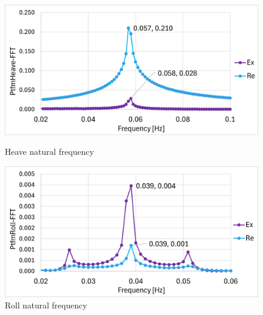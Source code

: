 \documentclass[a4paper, 11pt]{article}
\begin{document}
\begin{figure}[H]
    \begin{minipage}{0.47\textwidth}
        \centering
        \includegraphics[width=1\textwidth]{nat_freq_heave_1.png}
        \caption{\small Heave natural frequency}
        \label{fig:nat_freq_heave_recreated}
    \end{minipage}
    \hfill
    \begin{minipage}{0.48\textwidth}
        \centering
        \includegraphics[width=1\textwidth]{nat_freq_roll_1.png}
        \caption{\small Roll natural frequency}
        \label{fig:nat_freq_roll_recreated}
    \end{minipage}
\end{figure}
\end{document}

